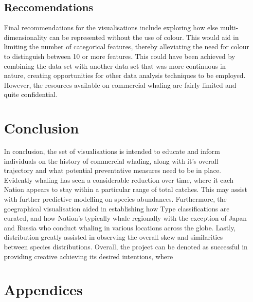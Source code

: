 \documentclass[12pt,a4paper]{article}
\begin{document}
\subsection{Reccomendations}
Final recommendations for the visualisations include exploring how else multi-dimensionality can be represented without the use of colour. This would aid in limiting the number of categorical features, thereby alleviating the need for colour to distinguish between 10 or more features. This could have been achieved by combining the data set with another data set that was more continuous in nature, creating opportunities for other data analysis techniques to be employed. However, the resources available on commercial whaling are fairly limited and quite confidential. 


\section{Conclusion}
In conclusion, the set of visualisations is intended to educate and inform individuals on the history of commercial whaling, along with it's overall trajectory and what potential preventative measures need to be in place. Evidently whaling has seen a considerable reduction over time, where it each Nation appears to stay within a particular range of total catches. This may assist with further predictive modelling on species abundances. Furthermore, the goegraphical visualisation aided in establishing how Type classifications are curated, and how Nation's typically whale regionally with the exception of Japan and Russia who conduct whaling in various locations across the globe. 
Lastly, distribution greatly assisted in observing the overall skew and similarities between species distributions. 
Overall, the project can be denoted as successful in providing creative achieving its desired intentions, where 

\newpage

\nocite{BNCC}


\section{Appendices}
\end{document}
